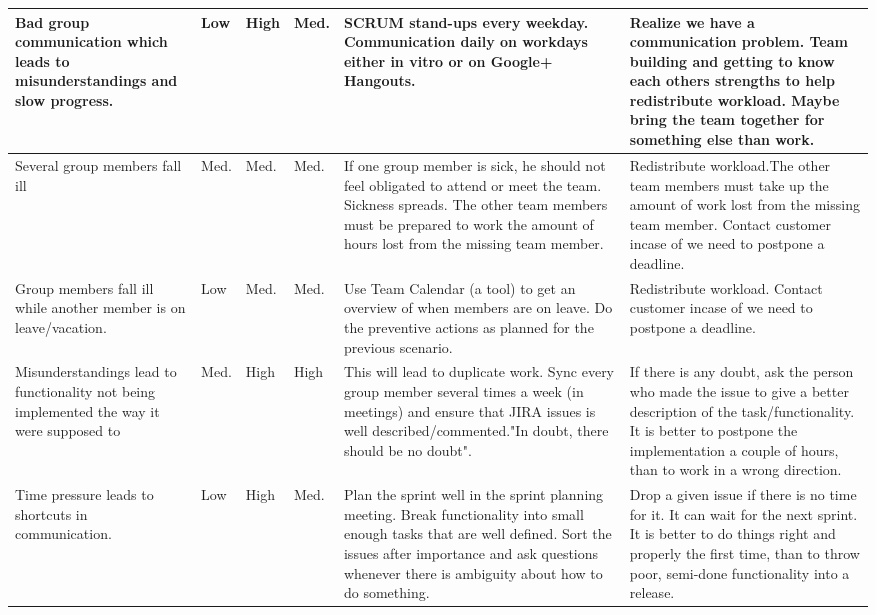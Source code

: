 \begin{supertabular}{|m{2.5cm}|m{1cm}|m{1cm}|m{1cm}|m{3cm}|m{3cm}|}
Bad group communication which leads to misunderstandings and slow progress. & Low & High & Med. & SCRUM stand-ups every weekday. Communication daily on workdays either in vitro or on Google+ Hangouts. & \vspace{3 mm}Realize we have a communication problem. Team building and getting to know each others strengths to help redistribute workload. Maybe bring the team together for something else than work.\vspace{2 mm} \\ \hline

Several group members fall ill & Med. & Med. & Med. & \vspace{3 mm}If one group member is sick, he should not feel obligated to attend or meet the team. Sickness spreads. The other team members must be prepared to work the amount of hours lost from the missing team member.\vspace{2 mm} & Redistribute workload.The other team members must take up the amount of work lost from the missing team member. Contact customer incase of we need to postpone a deadline. \\ \hline

Group members fall ill while another member is on leave/vacation. & Low & Med. & Med. & \vspace{3 mm}Use Team Calendar (a tool) to get an overview of when members are on leave. Do the preventive actions as planned for the previous scenario.\vspace{2 mm} & Redistribute workload. Contact customer incase of we need to postpone a deadline. \\ \hline

Misunderstandings lead to functionality not being implemented the way it were supposed to & Med. & High & High & \vspace{3 mm}This will lead to duplicate work. Sync every group member several times a week (in meetings) and ensure that JIRA issues is well described/commented."In doubt, there should be no doubt"\vspace{2 mm}. & If there is any doubt, ask the person who made the issue to give a better description of the task/functionality. It is better to postpone the implementation a couple of hours, than to work in a wrong direction. \\ \hline

Time pressure leads to shortcuts in communication. & Low & High & Med. & \vspace{3 mm}Plan the sprint well in the sprint planning meeting. Break functionality into small enough tasks that are well defined. Sort the issues after importance and ask questions whenever there is ambiguity about how to do something.\vspace{2 mm} & Drop a given issue if there is no time for it. It can wait for the next sprint. It is better to do things right and properly the first time, than to throw poor, semi-done functionality into a release. \\ \hline


\end{supertabular}
